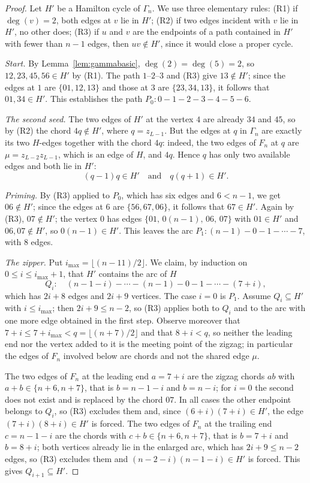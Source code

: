 \documentclass[11pt,a4paper]{article}
\theoremstyle{definition}
\theoremstyle{remark}
\begin{document}
\begin{proof}
Let $H'$ be a Hamilton cycle of $\Gamma_n$. We use three elementary rules: (R1) if $\deg(v)=2$, both edges at $v$ lie in $H'$; (R2) if two edges incident with $v$ lie in $H'$, no other does; (R3) if $u$ and $v$ are the endpoints of a path contained in $H'$ with fewer than $n-1$ edges, then $uv\notin H'$, since it would close a proper cycle.

\emph{Start.} By Lemma~\ref{lem:gammabasic}, $\deg(2)=\deg(5)=2$, so $12,23,45,56\in H'$ by (R1). The path $1$--$2$--$3$ and (R3) give $13\notin H'$; since the edges at $1$ are $\{01,12,13\}$ and those at $3$ are $\{23,34,13\}$, it follows that $01,34\in H'$. This establishes the path $P_0:0-1-2-3-4-5-6$.

\emph{The second seed.} The two edges of $H'$ at the vertex $4$ are already $34$ and $45$, so by (R2) the chord $4q\notin H'$, where $q=z_{L-1}$. But the edges at $q$ in $\Gamma_n$ are exactly its two $H$-edges together with the chord $4q$: indeed, the two edges of $F_n$ at $q$ are $\mu=z_{L-2}z_{L-1}$, which is an edge of $H$, and $4q$. Hence $q$ has only two available edges and both lie in $H'$:
\begin{equation}\label{eq:seed2}
(q-1)q\in H'\quad\text{and}\quad q(q+1)\in H'.
\end{equation}

\emph{Priming.} By (R3) applied to $P_0$, which has six edges and $6<n-1$, we get $06\notin H'$; since the edges at $6$ are $\{56,67,06\}$, it follows that $67\in H'$. Again by (R3), $07\notin H'$; the vertex $0$ has edges $\{01,\,0(n{-}1),\,06,\,07\}$ with $01\in H'$ and $06,07\notin H'$, so $0(n{-}1)\in H'$. This leaves the arc $P_1:(n-1)-0-1-\cdots-7$, with $8$ edges.

\emph{The zipper.} Put $i_{\max}=\lfloor (n-11)/2\rfloor$. We claim, by induction on $0\le i\le i_{\max}+1$, that $H'$ contains the arc of $H$
\[
Q_i:\quad (n-1-i)-\cdots-(n-1)-0-1-\cdots-(7+i),
\]
which has $2i+8$ edges and $2i+9$ vertices. The case $i=0$ is $P_1$. Assume $Q_i\subseteq H'$ with $i\le i_{\max}$; then $2i+9\le n-2$, so (R3) applies both to $Q_i$ and to the arc with one more edge obtained in the first step. Observe moreover that $7+i\le 7+i_{\max}<q=\lfloor (n+7)/2\rfloor$ and that $8+i<q$, so neither the leading end nor the vertex added to it is the meeting point of the zigzag; in particular the edges of $F_n$ involved below are chords and not the shared edge $\mu$.

The two edges of $F_n$ at the leading end $a=7+i$ are the zigzag chords $ab$ with $a+b\in\{n+6,n+7\}$, that is $b=n-1-i$ and $b=n-i$; for $i=0$ the second does not exist and is replaced by the chord $07$. In all cases the other endpoint belongs to $Q_i$, so (R3) excludes them and, since $(6+i)(7+i)\in H'$, the edge $(7+i)(8+i)\in H'$ is forced. The two edges of $F_n$ at the trailing end $c=n-1-i$ are the chords with $c+b\in\{n+6,n+7\}$, that is $b=7+i$ and $b=8+i$; both vertices already lie in the enlarged arc, which has $2i+9\le n-2$ edges, so (R3) excludes them and $(n-2-i)(n-1-i)\in H'$ is forced. This gives $Q_{i+1}\subseteq H'$.


\end{proof}
\end{document}
